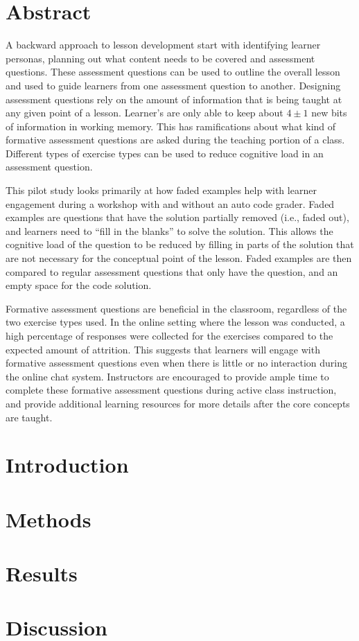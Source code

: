 \documentclass[../main.tex]{subfiles}
\begin{document}
\section*{Abstract}

A backward approach to lesson development start with identifying learner personas,
planning out what content needs to be covered and assessment questions.
These assessment questions can be used to outline the overall lesson
and used to guide learners from one assessment question to another.
Designing assessment questions rely on the amount of information that is being taught
at any given point of a lesson.
Learner's are only able to keep about $4\pm1$ new bits of information in working memory.
This has ramifications about what kind of formative assessment questions
are asked during the teaching portion of a class.
Different types of exercise types can be used
to reduce cognitive load in an assessment question.

This pilot study looks primarily at how faded examples help with learner engagement during a workshop
with and without an auto code grader.
Faded examples are questions that have the solution partially removed (i.e., faded out),
and learners need to ``fill in the blanks'' to solve the solution.
This allows the cognitive load of the question to be reduced by filling in parts of the
solution that are not necessary for the conceptual point of the lesson.
Faded examples are then compared to regular assessment questions that only have the question,
and an empty space for the code solution.

Formative assessment questions are beneficial in the classroom,
regardless of the two exercise types used.
In the online setting where the lesson was conducted,
a high percentage of responses were collected for the exercises compared to the expected amount of attrition.
This suggests that learners will engage with formative assessment questions even when
there is little or no interaction during the online chat system.
Instructors are encouraged to provide ample time to complete these formative assessment questions
during active class instruction,
and provide additional learning resources for more details after the core concepts are taught.

\section{Introduction}

    

\section{Methods}

    

\section{Results}

    

\section{Discussion}

    
\end{document}
